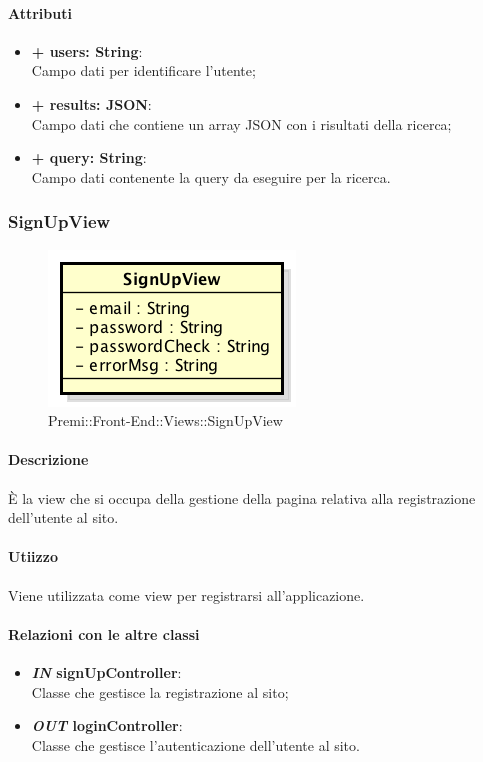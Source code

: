 	\paragraph{Attributi}
	\begin{itemize}
		\item \textbf{+ users: String}:\\
		Campo dati per identificare l'utente;
		\item \textbf{+ results: JSON}:\\
		Campo dati che contiene un array JSON con i risultati della ricerca;
		\item \textbf{+ query: String}:\\
		Campo dati contenente la query da eseguire per la ricerca.
	\end{itemize}
	
	
\subsubsection{SignUpView}
	\begin{figure}[h]
		\centering
		\includegraphics[width=0.4\linewidth]{img/premi_front_end_views_signupview}
		\caption[Premi::Front-End::Views::SignUpView]{Premi::Front-End::Views::SignUpView}
	\end{figure}
	
	\paragraph{Descrizione}
	È la view che si occupa della gestione della pagina relativa alla registrazione dell'utente al sito.
	
	\paragraph{Utiizzo}
	Viene utilizzata come view per registrarsi all'applicazione.
	
	\paragraph{Relazioni con le altre classi}
	\begin{itemize}
		\item \textbf{\textit{IN} signUpController}:\\
		Classe che gestisce la registrazione al sito;
		\item \textbf{\textit{OUT} loginController}:\\
		Classe che gestisce l'autenticazione dell'utente al sito.
	\end{itemize}
	
